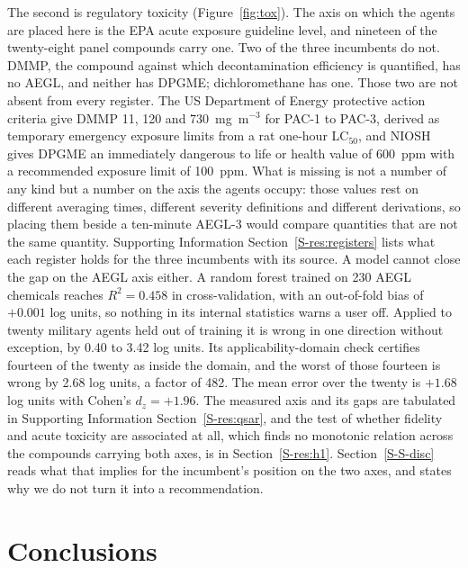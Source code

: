 \documentclass[journal=jacsat,manuscript=article,margin=1in]{achemso}
\begin{document}
The second is regulatory toxicity (Figure~\ref{fig:tox}). The axis on which
the agents are placed here is the EPA acute exposure guideline level, and
nineteen of the twenty-eight panel compounds carry one. Two of the three
incumbents do not. DMMP, the compound against which decontamination
efficiency is quantified, has no AEGL, and neither has DPGME; dichloromethane
has one. Those two are not absent from every register. The US Department of
Energy protective action criteria give DMMP 11, 120 and 730~mg~m$^{-3}$ for
PAC-1 to PAC-3, derived as temporary emergency exposure limits from a rat
one-hour LC$_{50}$, and NIOSH gives DPGME an immediately dangerous to life or
health value of 600~ppm with a recommended exposure limit of 100~ppm. What is
missing is not a number of any kind but a number on the axis the agents
occupy: those values rest on different averaging times, different severity
definitions and different derivations, so placing them beside a ten-minute
AEGL-3 would compare quantities that are not the same quantity. Supporting
Information Section~\ref{S-res:registers} lists what each register holds for
the three incumbents with its source. A model cannot close the gap on the
AEGL axis either. A random forest trained on
230 AEGL chemicals reaches $R^{2}=0.458$ in cross-validation, with an
out-of-fold bias of $+0.001$ log units, so nothing in its internal
statistics warns a user off. Applied to twenty military agents held out of
training it is wrong in one direction without exception, by 0.40 to 3.42
log units. Its applicability-domain check certifies fourteen of the twenty
as inside the domain, and the worst of those fourteen is wrong by 2.68 log
units, a factor of 482. The mean error over the twenty is $+1.68$ log units
with Cohen's $d_{z}=+1.96$. The measured axis and its gaps are tabulated in
Supporting Information Section~\ref{S-res:qsar}, and the test of whether
fidelity and acute toxicity are associated at all, which finds no monotonic
relation across the compounds carrying both axes, is in
Section~\ref{S-res:h1}. Section~\ref{S-S-disc} reads what that implies for
the incumbent's position on the two axes, and states why we do not turn it
into a recommendation.

\section{Conclusions}
\end{document}

